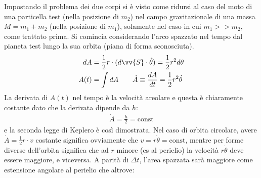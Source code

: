 \documentclass[a4paper, oneside]{book}
\begin{document}
Impostando il problema dei due corpi si è visto come ridursi al caso del 
moto di una particella test (nella posizione di $m_2$) nel campo gravitazionale 
di una massa $M = m_1 + m_2$ (nella posizione di $m_1$), solamente nel caso in cui 
$m_1 >> m_2$, come trattato prima. Si comincia considerando l'arco spazzato 
nel tempo dal pianeta test lungo la sua orbita (piana di forma sconosciuta).
\begin{align*}
    dA &= \frac{1}{2}r \cdot (d\vv{S} \cdot \hat{\theta}  ) = \frac{1}{2}r^{2}d\theta \\
    A(t) &= \int dA \qquad \dot{A} \equiv \frac{dA}{dt} = \frac{1}{2}r^{2} \dot{\theta}   
\end{align*}
La derivata di $A(t)$ nel tempo è la velocità 
areolare e questa è chiaramente costante dato che la derivata dipende da $h$:
\begin{align}
    \boxed{\dot{A} = \frac{h}{2} = \text{const} }
\end{align}
e la seconda legge di Keplero è così dimostrata. Nel caso di 
orbita circolare, avere $\dot{A} = \frac{1}{2}r\cdot v$ costante significa ovviamente
che $v = r\dot{\theta} = \text{const}$, mentre per forme diverse
dell'orbita significa che ad $r$ minore (es al perielio) 
la velocità $r\dot{\theta}$ deve essere maggiore, e viceversa. 
A parità di $\Delta t$, l'area spazzata sarà maggiore come estensione angolare
al perielio che altrove:
\end{document}
